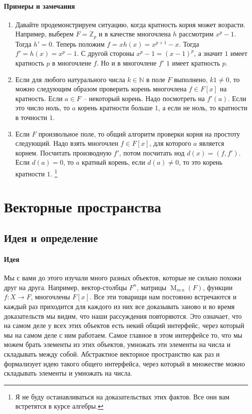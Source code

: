 \paragraph{Примеры и замечания}

\begin{enumerate}
\item
Давайте продемонстрируем ситуацию, когда кратность корня может возрасти.
Например, выберем $F = \mathbb Z_p$ и в качестве многочлена $h$ рассмотрим $x^p - 1$.
Тогда $h' = 0$.
Теперь положим $f = xh(x) = x^{p+1}- x$.
Тогда $f' = h(x) = x^p - 1$.
С другой стороны $x^p - 1 = (x-1)^p$, а значит $1$ имеет кратность $p$ в многочлене $f$.
Но и в многочлене $f'$ $1$ имеет кратность $p$.

\item Если для любого натурального числа $k\in \mathbb N$ в поле $F$ выполнено, $k 1 \neq 0$, то можно следующим образом проверить корень многочлена $f\in F[x]$ на кратность.
Если $a\in F$ -- некоторый корень.
Надо посмотреть на $f'(a)$.
Если это число ноль, то $a$ корень кратности больше $1$, а если не ноль, то кратности в точности $1$.

\item Если $F$ произвольное поле, то общий алгоритм проверки корня на простоту следующий.
Надо взять многочлен $f\in F[x]$, для которого $a$ является корнем.
Посчитать производную $f'$, потом посчитать нод $d(x) = (f, f')$.
Если $d(a) = 0$, то $a$ кратный корень, если $d(a) \neq 0$, то это корень кратности $1$.%
\footnote{Я не буду останавливаться на доказательствах этих фактов.
Все они вам встретятся в курсе алгебры.}
\end{enumerate}


\newpage
\section{Векторные пространства}

\subsection{Идея и определение}

\paragraph{Идея}

Мы с вами до этого изучали много разных объектов, которые не сильно похожи друг на друга.
Например, вектор-столбцы $F^n$, матрицы $\operatorname{M}_{m\,n}(F)$, функции $f\colon X\to F$, многочлены $F[x]$.
Все эти товарищи нам постоянно встречаются и каждый раз приходится для каждого из них все доказывать заново и во время доказательств мы видим, что наши рассуждения повторяются.
Это означает, что на самом деле у всех этих объектов есть некий общий интерфейс, через который мы на самом деле с ним работаем.
Самое главное в этом интерфейсе то, что мы можем брать элементы из этих объектов, умножать эти элементы на числа и складывать между собой.
Абстрактное векторное пространство как раз и формализует идею такого общего интерфейса, через который в множестве можно складывать элементы и умножать на числа.


